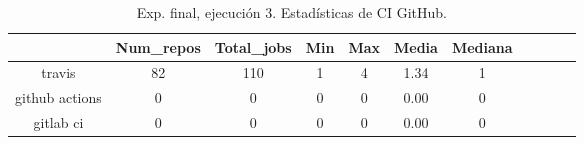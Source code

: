 \begin{table}[h]
  \centering
  \caption{Exp. final, ejecución 3. Estadísticas de CI GitHub.}
  \label{tab:tabla_f_3_2}

\begin{footnotesize}
\renewcommand{\arraystretch}{1.5} %
\begin{tabular}{ccccccccccc}
  \hline
  {} &  Num\_repos &  Total\_jobs &  Min &  Max &  Media &  Mediana \\
  \hline
  travis         &         82 &         110 &    1 &    4 &   1.34 &        1 \\
  github actions &          0 &           0 &    0 &    0 &   0.00 &        0 \\
  gitlab ci      &          0 &           0 &    0 &    0 &   0.00 &        0 \\
 \end{tabular}
\end{footnotesize}

\end{table}


